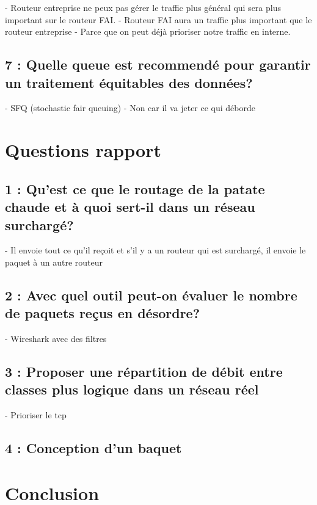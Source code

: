 \documentclass{article}
\begin{document}
- Routeur entreprise ne peux pas gérer le traffic plus général qui sera plus important sur le routeur FAI.
- Routeur FAI aura un traffic plus important que le routeur entreprise
- Parce que on peut déjà prioriser notre traffic en interne.

\subsection{7 : Quelle queue est recommendé pour garantir un traitement équitables des données?}

- SFQ (stochastic fair queuing)
- Non car il va jeter ce qui déborde

\section{Questions rapport}

\subsection{1 : Qu'est ce que le routage de la patate chaude et à quoi sert-il dans un réseau surchargé?}

- Il envoie tout ce qu'il reçoit et s'il y a un routeur qui est surchargé, il envoie le paquet à un autre routeur

\subsection{2 : Avec quel outil peut-on évaluer le nombre de paquets reçus en désordre?}

- Wireshark avec des filtres

\subsection{3 : Proposer une répartition de débit entre classes plus logique dans un réseau réel}

- Prioriser le tcp

\subsection{4 : Conception d'un baquet}

	


\section{Conclusion}

\printbibliography
\end{document}
